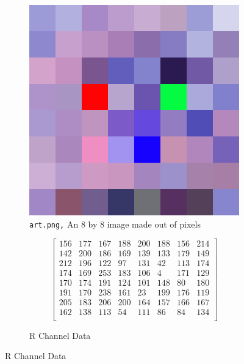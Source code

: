\documentclass{article}
\begin{document}
\begin{figure}[h]
\footnotesize
\begin{subfigure}{0.5\textwidth}
\begin{center}
	\includegraphics[width=\linewidth]{./implementation/Photos/art upscaled.png}
\end{center}
\caption{\texttt{art.png,} An 8 by 8 image made out of pixels}
\end{subfigure}
\begin{subfigure}{0.5\textwidth}
\begin{equation*}
\begin{bmatrix}
	156 & 177 & 167 & 188 & 200 & 188 & 156 & 214 \\
	142 & 200 & 186 & 169 & 139 & 133 & 179 & 149 \\
	212 & 196 & 122 &  97 & 131 &  42 & 113 & 174 \\
	174 & 169 & 253 & 183 & 106 &   4 & 171 & 129 \\
	170 & 174 & 191 & 124 & 101 & 148 &  80 & 180 \\
	191 & 170 & 238 & 161 &  23 & 199 & 176 & 119 \\
	205 & 183 & 206 & 200 & 164 & 157 & 166 & 167 \\
	162 & 138 & 113 &  54 & 111 &  86 &  84 & 134 \\
\end{bmatrix}
\end{equation*}
\caption{R Channel Data}
\end{subfigure}


\end{figure}
\end{document}
